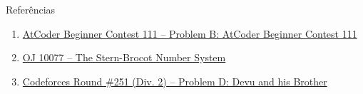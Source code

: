 \begin{frame}[fragile]{Referências}

    \begin{enumerate}
        \item \href{https://atcoder.jp/contests/abc111/tasks/abc111_b}{AtCoder Beginner
            Contest 111 -- Problem B: AtCoder Beginner Contest 111}

        \item \href{https://onlinejudge.org/index.php?option=com_onlinejudge&Itemid=8&page=show_problem&problem=1018}{OJ 10077 -- The Stern-Brocot Number System}

        \item \href{https://codeforces.com/problemset/problem/439/D}{Codeforces Round \#251 (Div. 2) -- Problem D: Devu and his Brother}
    \end{enumerate}

\end{frame}
